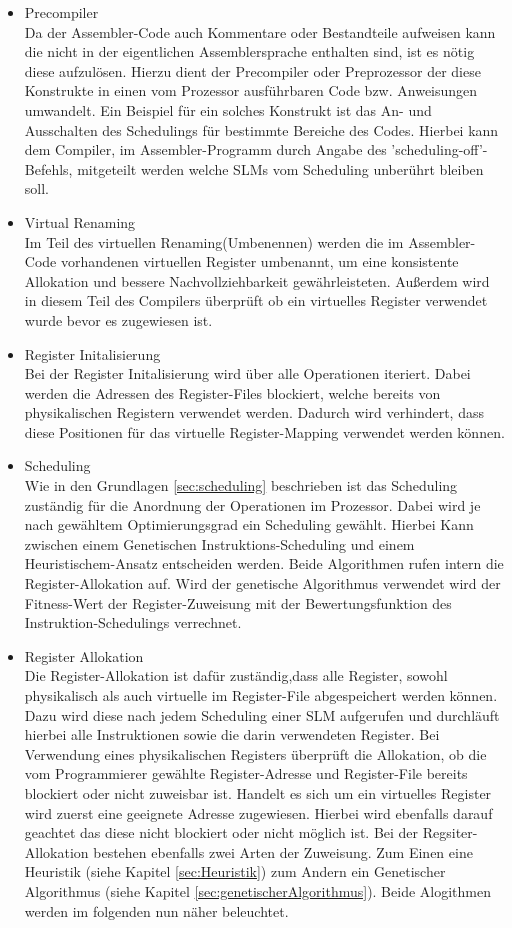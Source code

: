 \begin{itemize}
	\item Precompiler\\
		Da der Assembler-Code auch Kommentare oder Bestandteile aufweisen kann die nicht in der eigentlichen Assemblersprache enthalten sind, ist es nötig diese aufzulösen. Hierzu dient der Precompiler oder Preprozessor der diese Konstrukte in einen vom Prozessor ausführbaren Code bzw. Anweisungen umwandelt. Ein Beispiel für ein solches Konstrukt ist das An- und Ausschalten des Schedulings für bestimmte Bereiche des Codes. Hierbei kann dem Compiler, im Assembler-Programm durch Angabe des 'scheduling-off'-Befehls, mitgeteilt werden welche SLMs vom Scheduling unberührt bleiben soll.
	\item Virtual Renaming\\
		Im Teil des virtuellen Renaming(Umbenennen) werden die im Assembler-Code vorhandenen virtuellen Register umbenannt, um eine konsistente Allokation und bessere Nachvollziehbarkeit gewährleisteten. Außerdem wird in diesem Teil des Compilers überprüft ob ein virtuelles Register verwendet wurde bevor es zugewiesen ist.
	\item Register Initalisierung\\
		Bei der Register Initalisierung wird über alle Operationen iteriert. Dabei werden die Adressen des Register-Files blockiert, welche bereits von physikalischen Registern verwendet werden. Dadurch wird verhindert, dass diese Positionen für das virtuelle Register-Mapping verwendet werden können.
	\item Scheduling\\
		Wie in den Grundlagen \ref{sec:scheduling} beschrieben  ist das Scheduling zuständig für die Anordnung der Operationen im Prozessor. Dabei wird je nach gewähltem Optimierungsgrad ein Scheduling gewählt. Hierbei Kann zwischen einem Genetischen Instruktions-Scheduling und einem Heuristischem-Ansatz entscheiden werden. Beide Algorithmen rufen intern die Register-Allokation auf. Wird der genetische Algorithmus verwendet wird der Fitness-Wert der Register-Zuweisung mit der Bewertungsfunktion des Instruktion-Schedulings verrechnet.
	\item Register Allokation\\
		Die Register-Allokation ist dafür zuständig,dass alle Register, sowohl physikalisch als auch virtuelle im Register-File abgespeichert werden können. Dazu wird diese nach jedem Scheduling einer SLM aufgerufen und durchläuft hierbei alle Instruktionen sowie die darin verwendeten Register. Bei Verwendung eines physikalischen Registers überprüft die Allokation, ob die vom Programmierer gewählte Register-Adresse und Register-File bereits blockiert oder nicht zuweisbar ist. Handelt es sich um ein virtuelles Register wird zuerst eine geeignete Adresse zugewiesen. Hierbei wird ebenfalls darauf geachtet das diese nicht blockiert oder nicht möglich ist.
		Bei der Regsiter-Allokation bestehen ebenfalls zwei Arten der Zuweisung. Zum Einen eine Heuristik (siehe Kapitel \ref{sec:Heuristik}) zum Andern ein Genetischer Algorithmus (siehe Kapitel \ref{sec:genetischerAlgorithmus}). Beide Alogithmen werden im folgenden nun näher beleuchtet.
\end{itemize}


